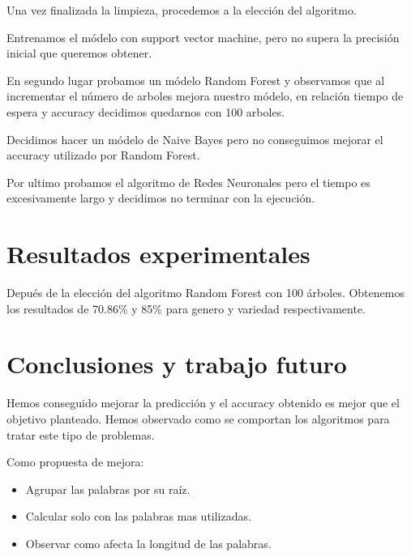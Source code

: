 \documentclass[12pt]{article}
\begin{document}
\begin{multicols}{2}
		Una vez finalizada la limpieza, procedemos a la elecci\'on del algoritmo. 
		
		
		Entrenamos el m\'odelo con support vector machine, pero no supera la precisi\'on inicial que queremos obtener.
		
		En segundo lugar probamos un m\'odelo Random Forest y observamos que al incrementar el n\'umero de arboles mejora nuestro m\'odelo, en relaci\'on tiempo de espera y accuracy decidimos quedarnos con 100 arboles.
		
		Decidimos hacer un m\'odelo de Naive Bayes pero no conseguimos mejorar el accuracy utilizado por Random Forest.
		
		Por ultimo probamos el algoritmo de Redes Neuronales pero el tiempo es excesivamente largo y decidimos no terminar con la ejecuci\'on.  
		
		
		\section{Resultados experimentales}
		
		Depu\'es de la elecci\'on del algoritmo Random Forest con 100 \'arboles.
		Obtenemos los resultados de  70.86\% y 85\%  para genero y variedad respectivamente. 
		
		\section{Conclusiones y trabajo futuro}
		
		Hemos conseguido mejorar la predicci\'on y el accuracy obtenido es mejor que el objetivo planteado.
		Hemos observado como se comportan los algoritmos para tratar este tipo de problemas.
		
		
		Como propuesta de mejora:
		\begin{itemize}
			\item Agrupar las palabras por su ra\'iz.
			\item Calcular solo con las palabras mas utilizadas.
			\item Observar como afecta la longitud de las palabras.
		\end{itemize}
			
	\end{multicols}
\end{document}
